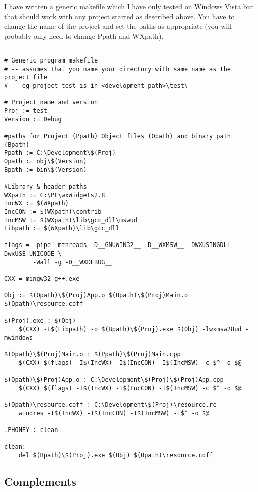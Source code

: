 I have written a generic makefile which I have only tested on Windows Vista but that should work with any project started as described above. You have to change the name of the project and set the paths as appropriate (you will probably only need to change Ppath and WXpath).

\begin{verbatim}  

# Generic program makefile
# -- assumes that you name your directory with same name as the project file
# -- eg project test is in <development path>\test\

# Project name and version
Proj := test
Version := Debug

#paths for Project (Ppath) Object files (Opath) and binary path (Bpath)
Ppath := C:\Development\$(Proj)
Opath := obj\$(Version)
Bpath := bin\$(Version)

#Library & header paths
WXpath := C:\PF\wxWidgets2.8
IncWX := $(WXpath)
IncCON := $(WXpath)\contrib
IncMSW := $(WXpath)\lib\gcc_dll\mswud
Libpath := $(WXpath)\lib\gcc_dll

flags = -pipe -mthreads -D__GNUWIN32__ -D__WXMSW__ -DWXUSINGDLL -DwxUSE_UNICODE \ 
        -Wall -g -D__WXDEBUG__

CXX = mingw32-g++.exe

Obj := $(Opath)\$(Proj)App.o $(Opath)\$(Proj)Main.o $(Opath)\resource.coff

$(Proj).exe : $(Obj)
    $(CXX) -L$(Libpath) -o $(Bpath)\$(Proj).exe $(Obj) -lwxmsw28ud -mwindows

$(Opath)\$(Proj)Main.o : $(Ppath)\$(Proj)Main.cpp
    $(CXX) $(flags) -I$(IncWX) -I$(IncCON) -I$(IncMSW) -c $^ -o $@

$(Opath)\$(Proj)App.o : C:\Development\$(Proj)\$(Proj)App.cpp
    $(CXX) $(flags) -I$(IncWX) -I$(IncCON) -I$(IncMSW) -c $^ -o $@

$(Opath)\resource.coff : C:\Development\$(Proj)\resource.rc
    windres -I$(IncWX) -I$(IncCON) -I$(IncMSW) -i$^ -o $@

.PHONEY : clean

clean:
    del $(Bpath)\$(Proj).exe $(Obj) $(Opath)\resource.coff
\end{verbatim}


\subsection{Complements}

